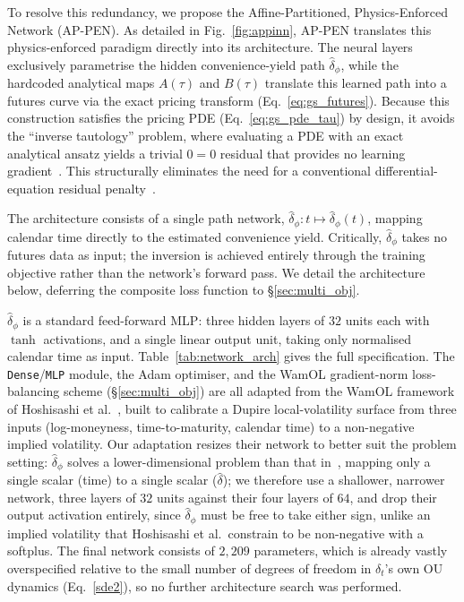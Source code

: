 \documentclass[sigconf, authorversion=true, nonacm=true]{acmart}
\begin{document}
To resolve this redundancy, we propose the Affine-Partitioned, Physics-Enforced Network (AP-PEN). As detailed in Fig.~\ref{fig:appinn}, AP-PEN translates this physics-enforced paradigm directly into its architecture. The neural layers exclusively parametrise the hidden convenience-yield path $\hat{\delta}_\phi$, while the hardcoded analytical maps $A(\tau)$ and $B(\tau)$ translate this learned path into a futures curve via the exact pricing transform (Eq.~\ref{eq:gs_futures}). Because this construction satisfies the pricing PDE (Eq.~\ref{eq:gs_pde_tau}) by design, it avoids the ``inverse tautology'' problem, where evaluating a PDE with an exact analytical ansatz yields a trivial $0=0$ residual that provides no learning gradient~\cite{rackauckas2020universal}. This structurally eliminates the need for a conventional differential-equation residual penalty~\cite{lu2021deepxde}.

The architecture consists of a single path network, $\hat{\delta}_\phi: t \mapsto \hat{\delta}_\phi(t)$, mapping calendar time directly to the estimated convenience yield. Critically, $\hat{\delta}_\phi$ takes no futures data as input; the inversion is achieved entirely through the training objective rather than the network's forward pass. We detail the architecture below, deferring the composite loss function to \S\ref{sec:multi_obj}.

$\hat{\delta}_\phi$ is a standard feed-forward MLP: three hidden layers of $32$ units each with $\tanh$ activations, and a single linear output unit, taking only normalised calendar time as input. Table~\ref{tab:network_arch} gives the full specification. The \texttt{Dense}/\texttt{MLP} module, the Adam optimiser, and the WamOL gradient-norm loss-balancing scheme (\S\ref{sec:multi_obj}) are all adapted from the WamOL framework of Hoshisashi et al.~\cite{Hoshisashi2024Physics-InformedPDEs, Hoshisashi2024Whack-a-moleSurface}, built to calibrate a Dupire local-volatility surface from three inputs (log-moneyness, time-to-maturity, calendar time) to a non-negative implied volatility. Our adaptation resizes their network to better suit the problem setting: $\hat{\delta}_\phi$ solves a lower-dimensional problem than that in~\cite{Hoshisashi2024Whack-a-moleSurface}, mapping only a single scalar (time) to a single scalar ($\hat{\delta}$); we therefore use a shallower, narrower network, three layers of $32$ units against their four layers of $64$, and drop their output activation entirely, since $\hat{\delta}_\phi$ must be free to take either sign, unlike an implied volatility that Hoshisashi et al.\ constrain to be non-negative with a softplus. The final network consists of $2{,}209$ parameters, which is already vastly overspecified relative to the small number of degrees of freedom in $\delta_t$'s own OU dynamics (Eq.~\ref{sde2}), so no further architecture search was performed.
\end{document}
